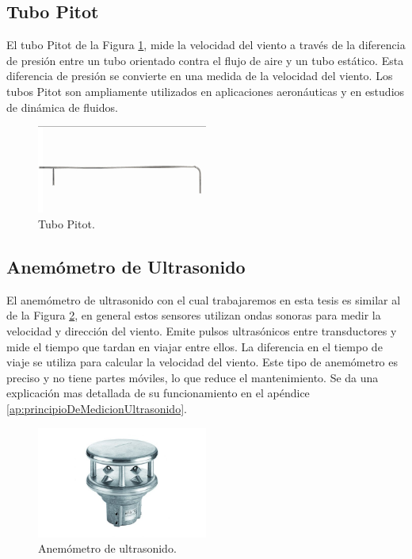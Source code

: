 \subsection*{Tubo Pitot}

El tubo Pitot  de la Figura \ref{fig:tuboPitot}, mide la velocidad del viento a través de la diferencia de presión entre un tubo orientado contra el flujo de aire y un tubo estático. Esta diferencia de presión se convierte en una medida de la velocidad del viento. Los tubos Pitot son ampliamente utilizados en aplicaciones aeronáuticas y en estudios de dinámica de fluidos.

\begin{figure}[h]
    \centering
    \includegraphics[width=0.5\textwidth]{Figuras/viento/sensores/tuboPitot.jpg}
    \caption{Tubo Pitot.  \cite{testoAnemometer}}
    \label{fig:tuboPitot}
\end{figure}

\subsection*{Anemómetro de Ultrasonido}

El anemómetro de ultrasonido con el cual trabajaremos en esta tesis es similar al de la Figura \ref{fig:ultrasonido}, en general estos sensores utilizan ondas sonoras para medir la velocidad y dirección del viento. Emite pulsos ultrasónicos entre transductores y mide el tiempo que tardan en viajar entre ellos. La diferencia en el tiempo de viaje se utiliza para calcular la velocidad del viento. Este tipo de anemómetro es preciso y no tiene partes móviles, lo que reduce el mantenimiento. Se da una explicación mas detallada de su funcionamiento en el apéndice \ref{ap:principioDeMedicionUltrasonido}.

\begin{figure}[h]
    \centering
    \includegraphics[width=0.5\textwidth]{Figuras/viento/sensores/ultrasonido.png}
    \caption{Anemómetro de ultrasonido. \cite{ventusumb2024}}
    \label{fig:ultrasonido}
\end{figure}

